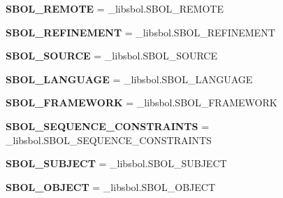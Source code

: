 \begin{DoxyCompactItemize}
\item 
{\bfseries S\+B\+O\+L\+\_\+\+R\+E\+M\+O\+TE} = \+\_\+libsbol.\+S\+B\+O\+L\+\_\+\+R\+E\+M\+O\+TE\hypertarget{namespacesbol_1_1libsbol_a4ed359517f676a825325d6f7dbfd6080}{}\label{namespacesbol_1_1libsbol_a4ed359517f676a825325d6f7dbfd6080}

\item 
{\bfseries S\+B\+O\+L\+\_\+\+R\+E\+F\+I\+N\+E\+M\+E\+NT} = \+\_\+libsbol.\+S\+B\+O\+L\+\_\+\+R\+E\+F\+I\+N\+E\+M\+E\+NT\hypertarget{namespacesbol_1_1libsbol_af3a7c495f3fb84473d1f02d62d69d94c}{}\label{namespacesbol_1_1libsbol_af3a7c495f3fb84473d1f02d62d69d94c}

\item 
{\bfseries S\+B\+O\+L\+\_\+\+S\+O\+U\+R\+CE} = \+\_\+libsbol.\+S\+B\+O\+L\+\_\+\+S\+O\+U\+R\+CE\hypertarget{namespacesbol_1_1libsbol_a8e1d64e4c79692e57eca988b59170d8f}{}\label{namespacesbol_1_1libsbol_a8e1d64e4c79692e57eca988b59170d8f}

\item 
{\bfseries S\+B\+O\+L\+\_\+\+L\+A\+N\+G\+U\+A\+GE} = \+\_\+libsbol.\+S\+B\+O\+L\+\_\+\+L\+A\+N\+G\+U\+A\+GE\hypertarget{namespacesbol_1_1libsbol_a83c55c22a798698584855d1cb0cc770f}{}\label{namespacesbol_1_1libsbol_a83c55c22a798698584855d1cb0cc770f}

\item 
{\bfseries S\+B\+O\+L\+\_\+\+F\+R\+A\+M\+E\+W\+O\+RK} = \+\_\+libsbol.\+S\+B\+O\+L\+\_\+\+F\+R\+A\+M\+E\+W\+O\+RK\hypertarget{namespacesbol_1_1libsbol_ad79e3396b319bb600a4f37840743a88f}{}\label{namespacesbol_1_1libsbol_ad79e3396b319bb600a4f37840743a88f}

\item 
{\bfseries S\+B\+O\+L\+\_\+\+S\+E\+Q\+U\+E\+N\+C\+E\+\_\+\+C\+O\+N\+S\+T\+R\+A\+I\+N\+TS} = \+\_\+libsbol.\+S\+B\+O\+L\+\_\+\+S\+E\+Q\+U\+E\+N\+C\+E\+\_\+\+C\+O\+N\+S\+T\+R\+A\+I\+N\+TS\hypertarget{namespacesbol_1_1libsbol_a78b6817a94ec1cd7d340d7a1120e4a99}{}\label{namespacesbol_1_1libsbol_a78b6817a94ec1cd7d340d7a1120e4a99}

\item 
{\bfseries S\+B\+O\+L\+\_\+\+S\+U\+B\+J\+E\+CT} = \+\_\+libsbol.\+S\+B\+O\+L\+\_\+\+S\+U\+B\+J\+E\+CT\hypertarget{namespacesbol_1_1libsbol_af7fa098cf604306c61d609a6c709b151}{}\label{namespacesbol_1_1libsbol_af7fa098cf604306c61d609a6c709b151}

\item 
{\bfseries S\+B\+O\+L\+\_\+\+O\+B\+J\+E\+CT} = \+\_\+libsbol.\+S\+B\+O\+L\+\_\+\+O\+B\+J\+E\+CT\hypertarget{namespacesbol_1_1libsbol_a78007a649e0637136e234a480b2428ba}{}\label{namespacesbol_1_1libsbol_a78007a649e0637136e234a480b2428ba}


\end{DoxyCompactItemize}
